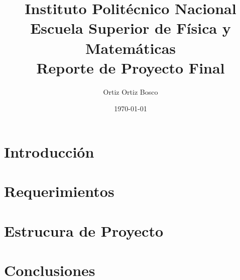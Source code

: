 \documentclass[12pt]{report}
\title{\huge Instituto Polit\'ecnico Nacional\\ \Big Escuela Superior de F\'isica y Matem\'aticas\\Reporte de Proyecto Final }
\author{Ortiz Ortiz Bosco}
\date{\today}
\begin{document}
\maketitle
\tableofcontents
\chapter{Introducci\'on}
\chapter{Requerimientos}
\chapter{Estrucura de Proyecto}
\chapter{Conclusiones}
\end{document}
